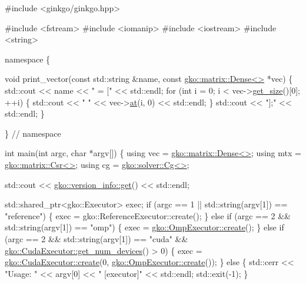 \begin{DoxyCodeInclude}
\textcolor{preprocessor}{#include <ginkgo/ginkgo.hpp>}


\textcolor{preprocessor}{#include <fstream>}
\textcolor{preprocessor}{#include <iomanip>}
\textcolor{preprocessor}{#include <iostream>}
\textcolor{preprocessor}{#include <string>}


\textcolor{keyword}{namespace }\{


\textcolor{keywordtype}{void} print\_vector(\textcolor{keyword}{const} std::string &name, \textcolor{keyword}{const} \hyperlink{classgko_1_1matrix_1_1Dense}{gko::matrix::Dense<>} *vec)
\{
    std::cout << name << \textcolor{stringliteral}{" = ["} << std::endl;
    \textcolor{keywordflow}{for} (\textcolor{keywordtype}{int} i = 0; i < vec->\hyperlink{classgko_1_1LinOp_a31b3c003388eb0b95393154f68c2b98d}{get\_size}()[0]; ++i) \{
        std::cout << \textcolor{stringliteral}{"    "} << vec->\hyperlink{classgko_1_1matrix_1_1Dense_af0f1af68853537807ca271a296de3cd0}{at}(i, 0) << std::endl;
    \}
    std::cout << \textcolor{stringliteral}{"];"} << std::endl;
\}


\}  \textcolor{comment}{// namespace}


\textcolor{keywordtype}{int} main(\textcolor{keywordtype}{int} argc, \textcolor{keywordtype}{char} *argv[])
\{
    \textcolor{keyword}{using} vec = \hyperlink{classgko_1_1matrix_1_1Dense}{gko::matrix::Dense<>};
    \textcolor{keyword}{using} mtx = \hyperlink{classgko_1_1matrix_1_1Csr}{gko::matrix::Csr<>};
    \textcolor{keyword}{using} cg = \hyperlink{classgko_1_1solver_1_1Cg}{gko::solver::Cg<>};

    std::cout << \hyperlink{classgko_1_1version__info_a6daeb8a087cfb57fa055526fc133d8eb}{gko::version\_info::get}() << std::endl;

    std::shared\_ptr<gko::Executor> exec;
    \textcolor{keywordflow}{if} (argc == 1 || std::string(argv[1]) == \textcolor{stringliteral}{"reference"}) \{
        exec = gko::ReferenceExecutor::create();
    \} \textcolor{keywordflow}{else} \textcolor{keywordflow}{if} (argc == 2 && std::string(argv[1]) == \textcolor{stringliteral}{"omp"}) \{
        exec = \hyperlink{classgko_1_1OmpExecutor_a33ca05fdd0fc928ee262fc9425304874}{gko::OmpExecutor::create}();
    \} \textcolor{keywordflow}{else} \textcolor{keywordflow}{if} (argc == 2 && std::string(argv[1]) == \textcolor{stringliteral}{"cuda"} &&
               \hyperlink{classgko_1_1CudaExecutor_aef0258494d14de0e56149b920c5173e5}{gko::CudaExecutor::get\_num\_devices}() > 0) \{
        exec = \hyperlink{classgko_1_1CudaExecutor_a2718a92034350650ef406ffdb60db090}{gko::CudaExecutor::create}(0, 
      \hyperlink{classgko_1_1OmpExecutor_a33ca05fdd0fc928ee262fc9425304874}{gko::OmpExecutor::create}());
    \} \textcolor{keywordflow}{else} \{
        std::cerr << \textcolor{stringliteral}{"Usage: "} << argv[0] << \textcolor{stringliteral}{" [executor]"} << std::endl;
        std::exit(-1);
    \}


\end{DoxyCodeInclude}
